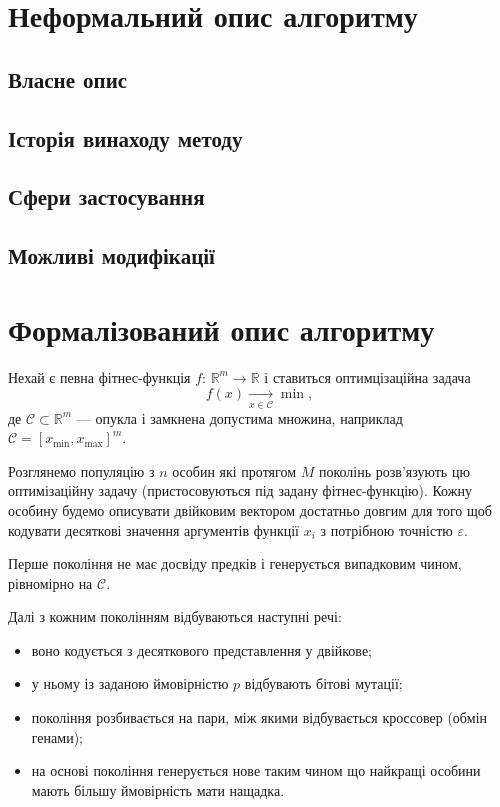\documentclass[a4paper, 12pt]{article}
\author{Скибицький Нікіта}
\date{\today}
\numberwithin{equation}{section}
\begin{document}

\tableofcontents

\section{Неформальний опис алгоритму}

\subsection{Власне опис}

\subsection{Історія винаходу методу}

\subsection{Сфери застосування}

\subsection{Можливі модифікації}

\section{Формалізований опис алгоритму}

Нехай є певна фітнес-функція $f$: $\mathbb{R}^m \to \mathbb{R}$ і ставиться оптимцізаційна задача
\begin{equation}
    f(x) \xrightarrow[x \in \mathcal{C}]{} \min,
\end{equation}
де $\mathcal{C} \subset \mathbb{R}^m$ --- опукла і замкнена допустима множина, наприклад $\mathcal{C} = [x_{\text{min}}, x_{\text{max}}]^m$. \medskip

Розглянемо популяцію з $n$ особин які протягом $M$ поколінь розв'язують цю оптимізаційну задачу (пристосовуються під задану фітнес-функцію). Кожну особину будемо описувати двійковим вектором достатньо довгим для того щоб кодувати десяткові значення аргументів функції $x_i$ з потрібною точністю $\varepsilon$. \medskip

Перше покоління не має досвіду предків і генерується випадковим чином, рівномірно на $\mathcal{C}$. \medskip

Далі з кожним поколінням відбуваються наступні речі:
\begin{itemize}
    \item воно кодується з десяткового представлення у двійкове;
    \item у ньому із заданою ймовірністю $p$ відбувають бітові мутації;
    \item покоління розбивається на пари, між якими відбувається кроссовер (обмін генами);
    \item на основі покоління генерується нове таким чином що найкращі особини мають більшу ймовірність мати нащадка.
\end{itemize}
\end{document}
